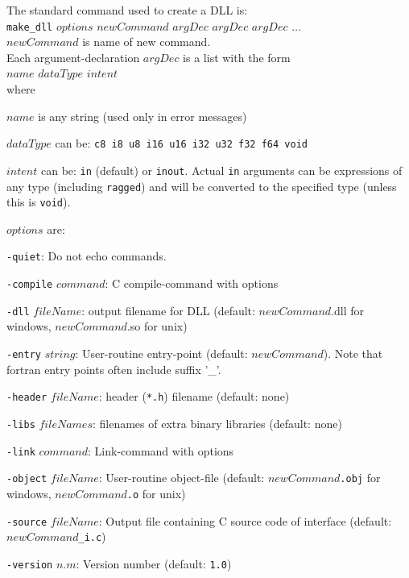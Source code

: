 The standard command used to create a DLL is:
\\
\texttt{make\_dll}
$\mathit{options}$
$\mathit{newCommand}$
$\mathit{argDec}$
$\mathit{argDec}$
$\mathit{argDec}$
$\ldots$
\\
$\mathit{newCommand}$ is name of new command.
\\
Each argument-declaration 
$\mathit{argDec}$ is a list with the form
\\
$\mathit{name}$
$\mathit{dataType}$
$\mathit{intent}$
\\
 where
  \begin{bullets}
    \item 
    $\mathit{name}$ is any string (used only in error messages)
    \item 
    $\mathit{dataType}$ can be: 
    \texttt{c8 i8 u8 i16 u16 i32 u32 f32 f64 void}
    \item 
    $\mathit{intent}$ can be: 
    \texttt{in} (default) or 
    \texttt{inout}. Actual 
    \texttt{in} arguments can be expressions of any type (including
    \texttt{ragged}) and will be converted to the specified type
    (unless this is 
    \texttt{void}).
  \end{bullets}
$\mathit{options}$ are:
\begin{simpleitems}
\item \texttt{-quiet}: Do not echo commands.
\item \texttt{-compile} $\mathit{command}$: C compile-command with options
\item \texttt{-dll} $\mathit{fileName}$: output filename for DLL
	(default: $\mathit{newCommand}$.dll for windows, $\mathit{newCommand}$.so for unix)
\item \texttt{-entry} $\mathit{string}$: User-routine entry-point (default: 
  $\mathit{newCommand}$). Note that fortran entry points often include suffix '\_'.
\item \texttt{-header} $\mathit{fileName}$: header (\texttt{*.h}) filename (default: none)
\item \texttt{-libs} $\mathit{fileNames}$: filenames of extra binary libraries (default: none)
\item \texttt{-link} $\mathit{command}$: Link-command with options
\item \texttt{-object} $\mathit{fileName}$: User-routine object-file
	(default: $\mathit{newCommand}$\texttt{.obj} for windows,
	$\mathit{newCommand}$\texttt{.o} for unix)
\item \texttt{-source} $\mathit{fileName}$: Output file containing C source code of interface
	(default: $\mathit{newCommand}$\texttt{\_i.c})
\item \texttt{-version} $\mathit{n.m}$: Version number (default: \texttt{1.0})
\end{simpleitems}

